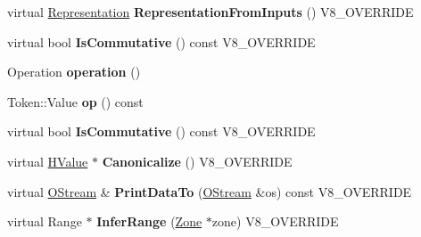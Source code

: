 \begin{DoxyCompactItemize}
\item 
\hypertarget{classv8_1_1internal_1_1_v8___f_i_n_a_l_adf198742368d46a5275c303414fdfc1d}{}virtual \hyperlink{classv8_1_1internal_1_1_representation}{Representation} {\bfseries Representation\+From\+Inputs} () V8\+\_\+\+O\+V\+E\+R\+R\+I\+D\+E\label{classv8_1_1internal_1_1_v8___f_i_n_a_l_adf198742368d46a5275c303414fdfc1d}

\item 
\hypertarget{classv8_1_1internal_1_1_v8___f_i_n_a_l_afbf350c98bc012a32e462f18ba21a137}{}virtual bool {\bfseries Is\+Commutative} () const V8\+\_\+\+O\+V\+E\+R\+R\+I\+D\+E\label{classv8_1_1internal_1_1_v8___f_i_n_a_l_afbf350c98bc012a32e462f18ba21a137}

\item 
\hypertarget{classv8_1_1internal_1_1_v8___f_i_n_a_l_a2e27d6ff6a6f4682ed503839c637dee1}{}Operation {\bfseries operation} ()\label{classv8_1_1internal_1_1_v8___f_i_n_a_l_a2e27d6ff6a6f4682ed503839c637dee1}

\item 
\hypertarget{classv8_1_1internal_1_1_v8___f_i_n_a_l_a7888b5a094e42a12307cd150fdbe678f}{}Token\+::\+Value {\bfseries op} () const \label{classv8_1_1internal_1_1_v8___f_i_n_a_l_a7888b5a094e42a12307cd150fdbe678f}

\item 
\hypertarget{classv8_1_1internal_1_1_v8___f_i_n_a_l_afbf350c98bc012a32e462f18ba21a137}{}virtual bool {\bfseries Is\+Commutative} () const V8\+\_\+\+O\+V\+E\+R\+R\+I\+D\+E\label{classv8_1_1internal_1_1_v8___f_i_n_a_l_afbf350c98bc012a32e462f18ba21a137}

\item 
\hypertarget{classv8_1_1internal_1_1_v8___f_i_n_a_l_aad5f871e0a6782c02e742ec017eca3cd}{}virtual \hyperlink{classv8_1_1internal_1_1_h_value}{H\+Value} $\ast$ {\bfseries Canonicalize} () V8\+\_\+\+O\+V\+E\+R\+R\+I\+D\+E\label{classv8_1_1internal_1_1_v8___f_i_n_a_l_aad5f871e0a6782c02e742ec017eca3cd}

\item 
\hypertarget{classv8_1_1internal_1_1_v8___f_i_n_a_l_ac450dad970b14246be761ccf5004924b}{}virtual \hyperlink{classv8_1_1internal_1_1_o_stream}{O\+Stream} \& {\bfseries Print\+Data\+To} (\hyperlink{classv8_1_1internal_1_1_o_stream}{O\+Stream} \&os) const V8\+\_\+\+O\+V\+E\+R\+R\+I\+D\+E\label{classv8_1_1internal_1_1_v8___f_i_n_a_l_ac450dad970b14246be761ccf5004924b}

\item 
\hypertarget{classv8_1_1internal_1_1_v8___f_i_n_a_l_a7d7c752019e44fc1ba3895619da6a7f5}{}virtual Range $\ast$ {\bfseries Infer\+Range} (\hyperlink{classv8_1_1internal_1_1_zone}{Zone} $\ast$zone) V8\+\_\+\+O\+V\+E\+R\+R\+I\+D\+E\label{classv8_1_1internal_1_1_v8___f_i_n_a_l_a7d7c752019e44fc1ba3895619da6a7f5}


\end{DoxyCompactItemize}
